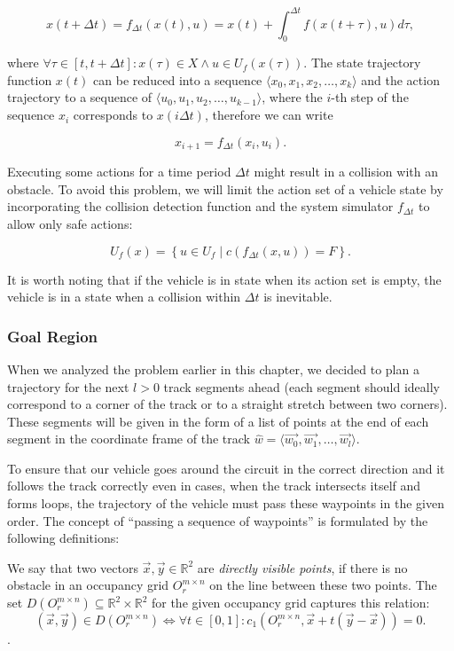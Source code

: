 \begin{equation}
	x(t+\Delta t)=f_{\Delta t}(x(t), u)=x(t) + \int_{0}^{\Delta t} f\left(x(t+\tau), u \right) d\tau,
\end{equation}

where $\forall \tau \in [t, t+\Delta t]: x(\tau)\in X \wedge u\in U_f(x(\tau))$. The state trajectory function $x(t)$ can be reduced into a sequence $\langle x_0, x_1, x_2, \ldots, x_k\rangle$ and the action trajectory to a sequence of $\langle u_0, u_1, u_2, \ldots, u_{k-1}\rangle$, where the $i$-th step of the sequence $x_i$ corresponds to $x(i\Delta t)$, therefore we can write

\[
	x_{i+1}=f_{\Delta t}(x_i, u_i).
\]

Executing some actions for a time period $\Delta t$ might result in a collision with an obstacle. To avoid this problem, we will limit the action set of a vehicle state by incorporating the collision detection function and the system simulator $f_{\Delta t}$ to allow only safe actions:

\[
U_f(x)=\left\{u\in U_f \mid c(f_{\Delta t}(x, u)) = F\right\}.
\]

It is worth noting that if the vehicle is in state when its action set is empty, the vehicle is in a state when a collision within $\Delta t$ is inevitable.

\subsubsection{Goal Region}

When we analyzed the problem earlier in this chapter, we decided to plan a trajectory for the next $l>0$ track segments ahead (each segment should ideally correspond to a corner of the track or to a straight stretch between two corners). These segments will be given in the form of a list of points at the end of each segment in the coordinate frame of the track $\hat{w}=\langle \vec{w_0}, \vec{w_1}, \ldots, \vec{w_l} \rangle$.

To ensure that our vehicle goes around the circuit in the correct direction and it follows the track correctly even in cases, when the track intersects itself and forms loops, the trajectory of the vehicle must pass these waypoints in the given order. The concept of ``passing a sequence of waypoints'' is formulated by the following definitions:

\begin{defn}
	We say that two vectors $\vec{x},\vec{y}\in\mathbb{R}^2$ are \textit{directly visible points}, if there is no obstacle in an occupancy grid $O_r^{m\times n}$ on the line between these two points. The set $D(O_r^{m\times n})\subseteq \mathbb{R}^2\times\mathbb{R}^2$ for the given occupancy grid captures this relation:
	\[
		(\vec{x}, \vec{y}) \in D(O_r^{m\times n}) \iff \forall t \in \left[0, 1\right]: c_1(O_{r}^{m\times n}, \vec{x} + t(\vec{y}-\vec{x})) = 0.
	\]
\label{def:directly_visible_points}.
\end{defn}

